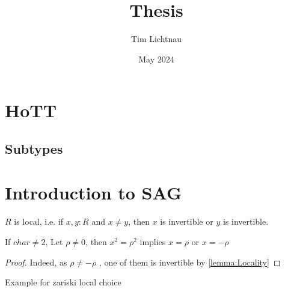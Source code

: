 \documentclass{article}
\title{Thesis}
\author{Tim Lichtnau }
\date{May 2024}
\begin{document}
\newtheorem*{warning}{Warning}
\newtheorem*{why}{Why I did it this way}
\newtheorem*{think}{Think about}
\maketitle
\tableofcontents

\section{HoTT}
\subsection{Subtypes}
\section{Introduction to SAG}
\begin{lemma}{\label{lemma:Locality}}
	$R$ is local, i.e. if $x, y : R$ and $x \neq y$, then $x$ is invertible or $y$ is invertible.
\end{lemma}
\begin{lemma}
	If $char \neq 2$, Let $\rho \neq 0$, then $x^2 = \rho^2$ implies $x = \rho$ or $x = -\rho$
\end{lemma}
\begin{proof}
	Indeed, as $\rho \neq - \rho$ , one of them is invertible by \ref{lemma:Locality} %
\end{proof}


Example for zariski local choice
\end{document}
